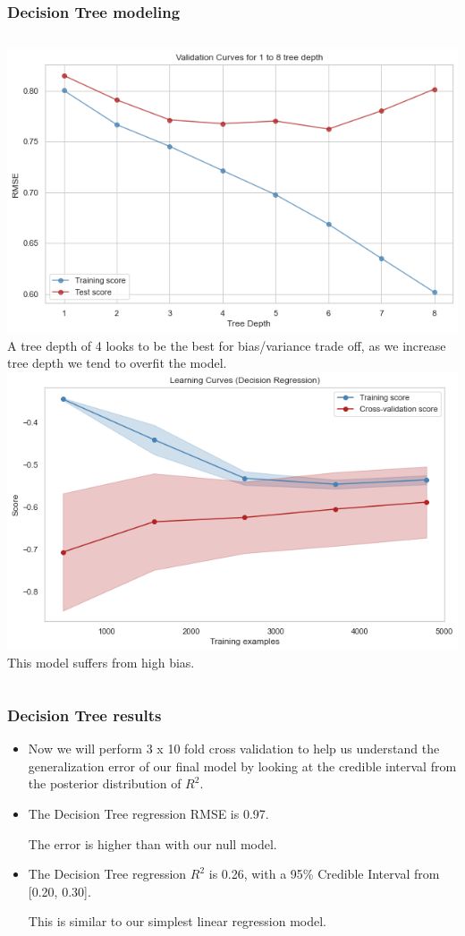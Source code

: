 \documentclass{beamer}
\begin{document}
		\begin{frame}
		\frametitle{ Decision Tree modeling }
		\begin{columns}
			\includegraphics[width=1.\textwidth]{images/decision tree validation.png}
			A tree depth of 4 looks to be the best for bias/variance trade off, as we increase tree depth we tend to overfit the model.
			\includegraphics[width=1.\textwidth]{images/decision tree learning.png}
			This model suffers from high bias.
		\end{columns}
	\end{frame}

		\begin{frame}
	\frametitle{ Decision Tree results }
	\begin{itemize}
		\item Now we will perform 3 x 10 fold cross validation to help us understand the generalization error of our final model by looking at the credible interval from the posterior distribution of $R^2$.  \par
		\item The Decision Tree regression RMSE is 0.97.  \par
			The error is higher than with our null model.  \par
		\item The Decision Tree regression $R^2$ is 0.26, with a 95\% Credible Interval from [0.20, 0.30].  \par 
		This is similar to our simplest linear regression model.  
	\end{itemize}
	
	\end{frame}
	
\end{document}

